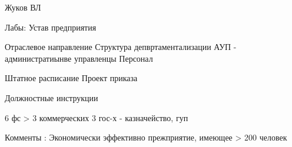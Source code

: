 \documentclass[a4paper,12pt]{report}
\begin{document}
	\def \nocredits {}
	\def \LineE {Конспект по дисциплине}
	\def \LineF {Организация и управление служжбой защиты информации}

	\maketitle




	Жуков ВЛ

	Лабы:
	Устав предприятия

	Отраслевое направление
	Структура депвртаментализации
	АУП - администратиынве управленцы
	Персонал

	Штатное расписание
	Проект приказа

	Должностные инструкции


	6 фс > 3 коммерческих
	3 гос-х - казначейство, гуп

	Комменты : Экономически эффективно прежприятие, имеющее > 200 человек



\end{document}
